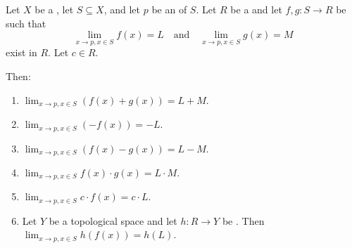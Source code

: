 \begin{proposition} \label{proposition:limits_of_functions_from_topological_spaces_to_topological_rings_at_accumulation_points_are_preserved_under_arithmetic_and_scalar_multiplication}
    Let $X$ be a , let $S \subseteq X$, and let $p$ be an  of $S$. Let $R$ be a  and let $f,g : S \to R$ be  such that
    $$\lim_{x \to p, x \in S} f(x) = L \quad\text{and}\quad \lim_{x \to p, x \in S} g(x) = M$$
     exist in $R$. Let $c \in R$.

    Then:
    \begin{enumerate}
        \item[$(+)$] $\displaystyle\lim_{x \to p, x \in S} (f(x) + g(x)) = L + M$.
        \item[$(-)$] $\displaystyle\lim_{x \to p, x \in S} (-f(x)) = -L$.
        \item[$(-)$] $\displaystyle\lim_{x \to p, x \in S} (f(x) - g(x)) = L - M$.
        \item[$(\cdot)$] $\displaystyle\lim_{x \to p, x \in S} f(x) \cdot g(x) = L \cdot M$.
        \item[$(c\,\cdot)$] $\displaystyle\lim_{x \to p, x \in S} c \cdot f(x) = c \cdot L$.
        \item[$\circ$] Let $Y$ be a topological space and let $h : R \to Y$ be . Then $\displaystyle\lim_{x \to p, x \in S} h(f(x)) = h(L)$.
    \end{enumerate}
\end{proposition}

